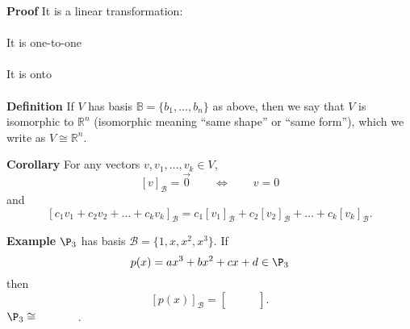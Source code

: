  \begin{frame}[fragile]
\textbf{Proof}
It is a linear transformation:  \\ \ \\
It is one-to-one  \\ \ \\
It is onto \\ \ \\



\textbf{Definition}
If $V$ has basis $\mathbb B=\{b_1, \dots, b_n\}$ as above, then we say that $V$ is isomorphic to $\mathbb R^n$ (isomorphic meaning ``same shape'' or ``same form''), 
which we write as $V \cong \mathbb R^n$.

\end{frame}






 \begin{frame}[fragile]
  \textbf{Corollary}
For any vectors ${v},{v}_1,\dots,{v}_k\in V$, 
\[
 [{v}]_{\mathcal B} = \vec{0} \qquad \iff\qquad {v} = {0}
\]
and 
\[
[c_1 {v}_1 + c_2 {v}_2 + \dots + c_k{v}_k ]_{\mathcal B}
= c_1 [{v}_1]_{\mathcal B} + c_2 [{v}_2]_{\mathcal B} + \dots + c_k[{v}_k ]_{\mathcal B}.
\]



\textbf{Example}
$\P_3$ has basis ${\mathcal B} = \{1,x,x^2,x^3 \}$.  If 
\[
p(x) = ax^3 + bx^2 + cx +d \in \P_3
\]
then 
\[
[ p(x) ] _{\mathcal B} = \left[\begin{array}{rrrrrr} \qquad \\ \qquad \\ \qquad \end{array} \right] .
\]
$\P_3 \cong \textbf{\hskip 12 mm} $.


\end{frame}








